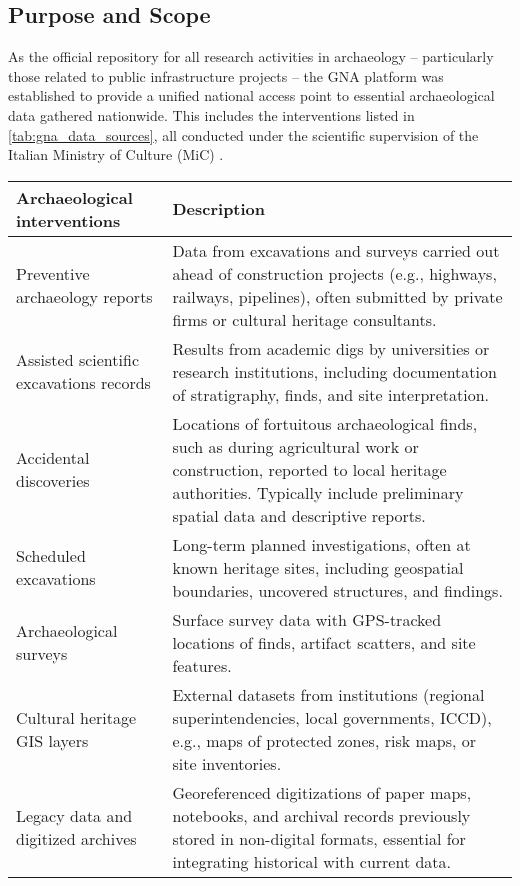 \begin{spacing}{1.5}
\subsection{Purpose and Scope}
As the official repository for all research activities in archaeology -- particularly those related to public infrastructure projects -- the GNA platform was established to provide a unified national access point to essential archaeological data gathered nationwide. This includes the interventions listed in \autoref{tab:gna_data_sources}, all conducted under the scientific supervision of the Italian Ministry of Culture (MiC) \citep{acconcia_pubblicazione_2023,falcone_dematerializzazione_2023}.

\addtocounter{table}{-1}
\begin{table}[H]
\centering
\footnotesize
\begin{tabularx}{\textwidth}{ l >{\justifying\noindent\arraybackslash}p{} }
\toprule
\textbf{Archaeological interventions} & \textbf{Description} \\
\midrule
Preventive archaeology reports & Data from excavations and surveys carried out ahead of construction projects (e.g., highways, railways, pipelines), often submitted by private firms or cultural heritage consultants. \\
\cmidrule(lr){1-2}
Assisted scientific excavations records & Results from academic digs by universities or research institutions, including documentation of stratigraphy, finds, and site interpretation. \\
\cmidrule(lr){1-2}
Accidental discoveries & Locations of fortuitous archaeological finds, such as during agricultural work or construction, reported to local heritage authorities. Typically include preliminary spatial data and descriptive reports. \\
\cmidrule(lr){1-2}
Scheduled excavations & Long-term planned investigations, often at known heritage sites, including geospatial boundaries, uncovered structures, and findings. \\
\cmidrule(lr){1-2}
Archaeological surveys & Surface survey data with GPS-tracked locations of finds, artifact scatters, and site features. \\
\cmidrule(lr){1-2}
Cultural heritage GIS layers & External datasets from institutions (regional superintendencies, local governments, ICCD), e.g., maps of protected zones, risk maps, or site inventories. \\
\cmidrule(lr){1-2}
Legacy data and digitized archives & Georeferenced digitizations of paper maps, notebooks, and archival records previously stored in non-digital formats, essential for integrating historical with current data. \\

\end{tabularx}
\end{table}
\end{spacing}
